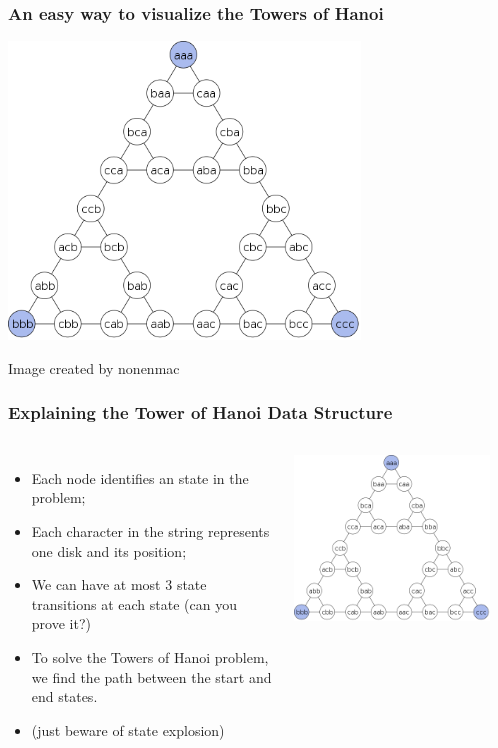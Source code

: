 \documentclass{beamer}
\begin{document}
\begin{frame}
  \frametitle{An easy way to visualize the Towers of Hanoi}
  \begin{center}
    \includegraphics[width=0.7\textwidth]{img/hanoi_graph}
  \end{center}
  {\smaller Image created by nonenmac}
\end{frame}

\begin{frame}
  \frametitle{Explaining the Tower of Hanoi Data Structure}
  \begin{columns}[c]
    \begin{itemize}
    \item Each node identifies an state in the problem;
    \item Each character in the string represents one disk and its
      position;
    \item We can have at most 3 state transitions at each state (can
      you prove it?)
    \item To solve the Towers of Hanoi problem, we find the path
      between the start and end states.
    \item (just beware of state explosion)
    \end{itemize}
    \includegraphics[width=0.9\textwidth]{img/hanoi_graph}
    \vfill
  \end{columns}
\end{frame}
\end{document}
